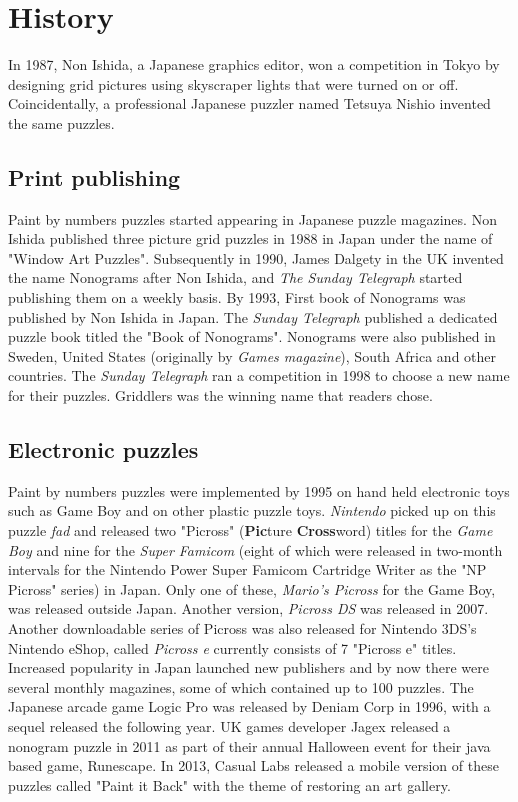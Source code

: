 \chapter{History}
In 1987, Non Ishida, a Japanese graphics editor, won a competition in Tokyo by designing grid pictures using skyscraper lights that were turned on or off. Coincidentally, a professional Japanese puzzler named Tetsuya Nishio invented the same puzzles.\cite{refer0}


\section{Print publishing}
Paint by numbers puzzles started appearing in Japanese puzzle magazines. Non Ishida published three picture grid puzzles in 1988 in Japan under the name of "Window Art Puzzles". Subsequently in 1990, James Dalgety in the UK invented the name Nonograms after Non Ishida, and \textit{\textit{The Sunday Telegraph}} started publishing them on a weekly basis. By 1993, First book of Nonograms was published by Non Ishida in Japan. The \textit{Sunday Telegraph} published a dedicated puzzle book titled the "Book of Nonograms". Nonograms were also published in Sweden, United States (originally by \textit{\textit{Games} magazine}\cite{refer1}), South Africa and other countries. The \textit{Sunday Telegraph} ran a competition in 1998 to choose a new name for their puzzles. Griddlers was the winning name that readers chose.


\section{Electronic puzzles}
Paint by numbers puzzles were implemented by 1995 on hand held electronic toys such as Game Boy and on other plastic puzzle toys. \textit{Nintendo} picked up on this puzzle \textit{fad} and released two "Picross" (\textbf{Pic}ture \textbf{Cross}word) titles for the \textit{Game Boy} and nine for the \textit{Super Famicom} (eight of which were released in two-month intervals for the Nintendo Power Super Famicom Cartridge Writer as the "NP Picross" series) in Japan. Only one of these, \textit{\textit{Mario's Picross}} for the Game Boy, was released outside Japan. Another version, \textit{Picross DS} was released in 2007. Another downloadable series of Picross was also released for Nintendo 3DS's Nintendo eShop, called \textit{Picross e} currently consists of 7 "Picross e" titles.  Increased popularity in Japan launched new publishers and by now there were several monthly magazines, some of which contained up to 100 puzzles. The Japanese arcade game Logic Pro was released by Deniam Corp in 1996, with a sequel released the following year. UK games developer Jagex released a nonogram puzzle in 2011 as part of their annual Halloween event for their java based game, Runescape. In 2013, Casual Labs released a mobile version of these puzzles called "Paint it Back" with the theme of restoring an art gallery.


